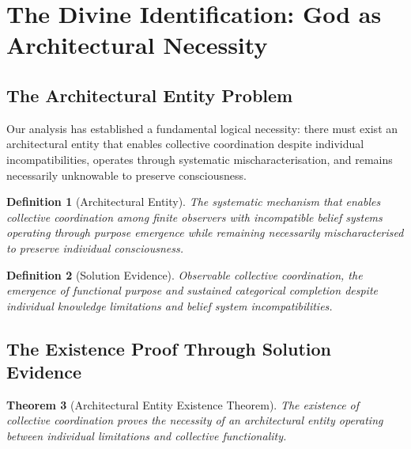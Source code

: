 \documentclass[12pt,a4paper]{article}
\newtheorem{theorem}{Theorem}[section]
\newtheorem{definition}[theorem]{Definition}
\begin{document}
\section{The Divine Identification: God as Architectural Necessity}

\subsection{The Architectural Entity Problem}

Our analysis has established a fundamental logical necessity: there must exist an architectural entity that enables collective coordination despite individual incompatibilities, operates through systematic mischaracterisation, and remains necessarily unknowable to preserve consciousness.

\begin{definition}[Architectural Entity]
The systematic mechanism that enables collective coordination among finite observers with incompatible belief systems operating through purpose emergence while remaining necessarily mischaracterised to preserve individual consciousness.
\end{definition}

\begin{definition}[Solution Evidence]
Observable collective coordination, the emergence of functional purpose and sustained categorical completion despite individual knowledge limitations and belief system incompatibilities.
\end{definition}

\subsection{The Existence Proof Through Solution Evidence}

\begin{theorem}[Architectural Entity Existence Theorem]
The existence of collective coordination proves the necessity of an architectural entity operating between individual limitations and collective functionality.
\end{theorem}
\end{document}
